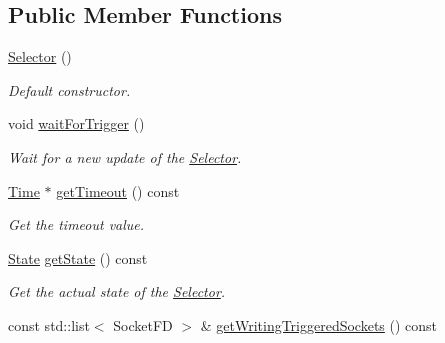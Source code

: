 \subsection*{Public Member Functions}
\begin{DoxyCompactItemize}
\item 
\hypertarget{classmognetwork_1_1_selector_ac2dc59256b3b676a6c04102f5ea5515a}{\hyperlink{classmognetwork_1_1_selector_ac2dc59256b3b676a6c04102f5ea5515a}{Selector} ()}\label{classmognetwork_1_1_selector_ac2dc59256b3b676a6c04102f5ea5515a}

\begin{DoxyCompactList}\small\item\em Default constructor. \end{DoxyCompactList}\item 
\hypertarget{classmognetwork_1_1_selector_aba14d0165c8b6408e75a8a7db3cbffb7}{void \hyperlink{classmognetwork_1_1_selector_aba14d0165c8b6408e75a8a7db3cbffb7}{wait\-For\-Trigger} ()}\label{classmognetwork_1_1_selector_aba14d0165c8b6408e75a8a7db3cbffb7}

\begin{DoxyCompactList}\small\item\em Wait for a new update of the \hyperlink{classmognetwork_1_1_selector}{Selector}. \end{DoxyCompactList}\item 
\hyperlink{_selector_8hh_af47ac292ef7224cf549b944d138ba4ae}{Time} $\ast$ \hyperlink{classmognetwork_1_1_selector_ae1cb38fe53e4313751062277b39fbfd5}{get\-Timeout} () const 
\begin{DoxyCompactList}\small\item\em Get the timeout value. \end{DoxyCompactList}\item 
\hyperlink{classmognetwork_1_1_selector_a51d709c3579bf32265d68d4313df5794}{State} \hyperlink{classmognetwork_1_1_selector_aab8261de074ef927dfe62bb9ddaafb93}{get\-State} () const 
\begin{DoxyCompactList}\small\item\em Get the actual state of the \hyperlink{classmognetwork_1_1_selector}{Selector}. \end{DoxyCompactList}\item 
\hypertarget{classmognetwork_1_1_selector_ab35641925422b2082de069f745e0034e}{const std\-::list$<$ Socket\-F\-D $>$ \& \hyperlink{classmognetwork_1_1_selector_ab35641925422b2082de069f745e0034e}{get\-Writing\-Triggered\-Sockets} () const }\label{classmognetwork_1_1_selector_ab35641925422b2082de069f745e0034e}


\end{DoxyCompactItemize}
